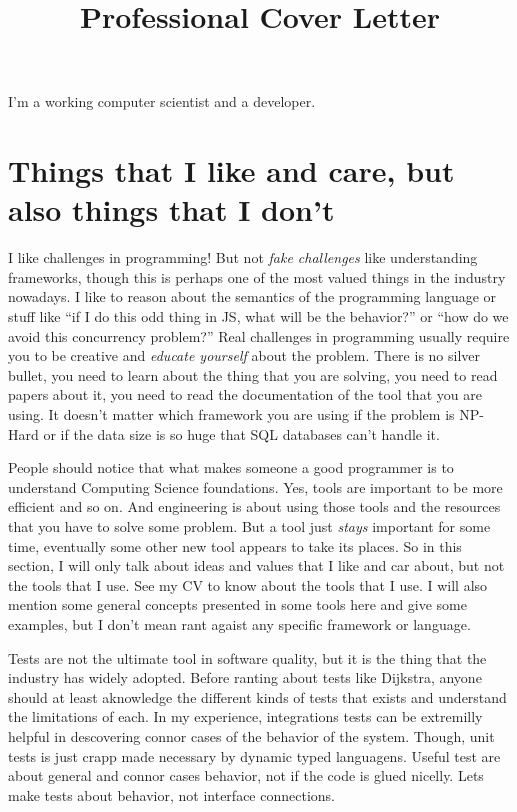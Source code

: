 \documentclass[11pt,a4paper,sans]{moderncv}
\title{Professional Cover Letter}
\begin{document}
\makecvtitle %
I'm a working computer scientist and a developer.

\section{Things that I like and care, but also things that I don't} I like
challenges in programming! But not \textit{fake challenges} like understanding
frameworks, though this is perhaps one of the most valued things in the industry
nowadays. I like to reason about the semantics of the programming language or
stuff like ``if I do this odd thing in JS, what will be the behavior?'' or ``how do we
avoid this concurrency problem?'' Real challenges in programming usually require
you to be creative and \textit{educate yourself} about the problem. There is no
silver bullet, you need to learn about the thing that you are solving, you need
to read papers about it, you need to read the documentation of the tool that you
are using. It doesn't matter which framework you are using if the problem is
NP-Hard or if the data size is so huge that SQL databases can't handle it.

People should notice that what makes someone a good programmer is to understand
Computing Science foundations. Yes, tools are important to be more efficient and
so on. And engineering is about using those tools and the resources that you
have to solve some problem. But a tool just \textit{stays} important for some
time, eventually some other new tool appears to take its places. So in this
section, I will only talk about ideas and values that I like and car about, but
not the tools that I use. See my CV to know about the tools that I use. I will
also mention some general concepts presented in some tools here and give some
examples, but I don't mean rant agaist any specific framework or language.

Tests are not the ultimate tool in software
quality, but it is the thing that the industry has widely adopted.
Before ranting about tests like Dijkstra, anyone should at least aknowledge
the different kinds of tests that exists and understand the limitations of each.
In my experience, integrations tests can be extremilly helpful in descovering
connor cases of the behavior of the system. Though, unit tests is just crapp
made necessary by dynamic typed languagens. Useful test are about general
and connor cases behavior, not if the code is glued nicelly. Lets make tests
about behavior, not interface connections.
\end{document}
